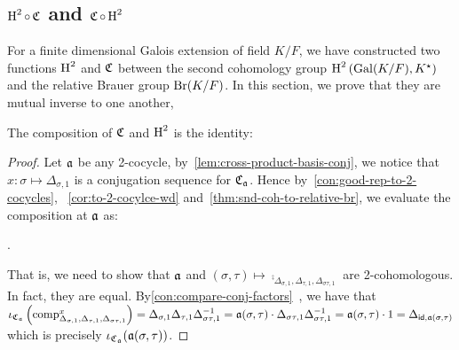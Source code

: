 \subsection{$\operatorname{H}^{2} \circ \operatorname{\mathfrak{C}}$ and $\operatorname{\mathfrak{C}} \circ \operatorname{H}^{2}$}

For a finite dimensional Galois extension of field $K/F$, we have constructed two functions $\operatorname{H}^{2}$ and $\operatorname{\mathfrak{C}}$ between the second cohomology group $\operatorname{H}^{2}\left(\operatorname{Gal}(K/F), K^{\star}\right)$ and the relative Brauer group $\operatorname{Br}(K/F)$. In this section, we prove that they are mutual inverse to one another,

\begin{lemma}\label{lem:relative-br-snd-inverse-1}
  The composition of $\operatorname{\mathfrak{C}}$ and $\operatorname{H}^{2}$ is the identity:
  \begin{center}
  \end{center}
  \leanok
\end{lemma}
\begin{proof}
  Let $\mathfrak{a}$ be any 2-cocycle, by~\cref{lem:cross-product-basis-conj}, we notice that $x : \sigma \mapsto \Delta_{\sigma, 1}$ is a conjugation sequence for $\operatorname{\mathfrak{C}}_{\mathfrak{a}}$. Hence by~\cref{con:good-rep-to-2-cocycles}, ~\cref{cor:to-2-cocylce-wd} and~\cref{thm:snd-coh-to-relative-br}, we evaluate the composition at $\mathfrak{a}$ as:
  \begin{center}
    .
  \end{center}
  That is, we need to show that $\mathfrak{a}$ and $(\sigma, \tau) \mapsto \comp_{\Delta_{\sigma, 1}, \Delta_{\tau, 1}, \Delta_{\sigma\tau, 1}}$ are 2-cohomologous. In fact, they are equal.
  By\cref{con:compare-conj-factors}~, we have that $\iota_{\operatorname{\mathfrak{C}}_{\mathfrak{a}}}\left(\operatorname{comp}^{x}_{\Delta_{\sigma, 1}, \Delta_{\tau, 1}, \Delta_{\sigma\tau, 1}}\right) = \Delta_{\sigma, 1}\Delta_{\tau, 1}\Delta_{\sigma\tau, 1}^{-1} = \mathfrak{a}(\sigma,\tau)\cdot \Delta_{\sigma\tau, 1}\Delta_{\sigma\tau, 1}^{-1} = \mathfrak{a}(\sigma,\tau)\cdot 1 = \Delta_{\mathsf{id},\mathfrak{a}(\sigma,\tau)}$ which is precisely $\iota_{\operatorname{\mathfrak{C}}_{\mathfrak{a}}}(\mathfrak{a}(\sigma,\tau))$.
\end{proof}

